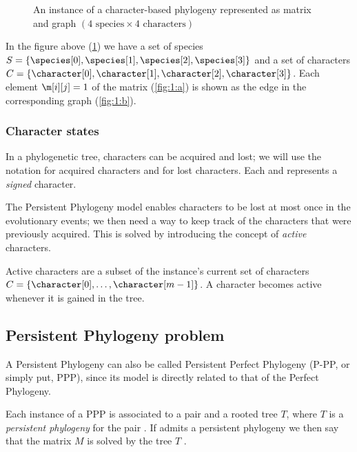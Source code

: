 \begin{figure}[h]
  

  \caption{An instance of a character-based phylogeny represented as matrix and graph $(\text{4 species} \times \text{4 characters})$}
  \label{fig:1}
\end{figure}

In the figure above (\ref{fig:1}) we have a set of species $S = \{ \species[0], \species[1], \species[2], \species[3] \}$ and a set of characters $C = \{ \character[0], \character[1], \character[2], \character[3] \}$.
Each element $\m[i][j] = 1$ of the matrix (\ref{fig:1:a}) is shown as the edge \edge{\species[i]}{\character[j]} in the corresponding graph (\ref{fig:1:b}).

\subsubsection{Character states}\label{sssec:charstates}


In a phylogenetic tree, characters can be acquired and lost; we will use the notation \character[][+] for acquired characters and \character[][-] for lost characters. Each \character[][+] and \character[][-] represents a \emph{signed} character.

The Persistent Phylogeny model enables characters to be lost at most once in the evolutionary events; we then need a way to keep track of the characters that were previously acquired. This is solved by introducing the concept of \emph{active} characters.

Active characters are a subset of the instance's current set of characters $C = \{ \character[0], \dots, \character[m-1] \}$.
A character becomes active whenever it is gained in the tree.

\subsection{Persistent Phylogeny problem}\label{ssec:ppp}


A Persistent Phylogeny can also be called Persistent Perfect Phylogeny (P-PP, or simply put, PPP), since its model is directly related to that of the Perfect Phylogeny.

Each instance of a PPP is associated to a pair \ma{} and a rooted tree $T$, where $T$ is a \emph{persistent phylogeny} for the pair \ma{}.  If \ma{} admits a persistent phylogeny we then say that the matrix $M$ is solved by the tree $T$ \cite{PPPptime2016,PPPcgraph2016}.

